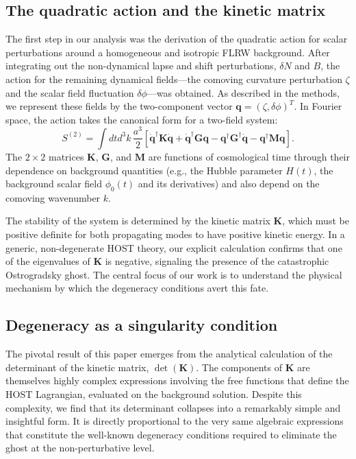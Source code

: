 \documentclass[twocolumn]{aastex631}
\begin{document}
\subsection{The quadratic action and the kinetic matrix}

The first step in our analysis was the derivation of the quadratic action for scalar perturbations around a homogeneous and isotropic FLRW background. After integrating out the non-dynamical lapse and shift perturbations, $\delta N$ and $B$, the action for the remaining dynamical fields---the comoving curvature perturbation $\zeta$ and the scalar field fluctuation $\delta\phi$---was obtained. As described in the methods, we represent these fields by the two-component vector $\mathbf{q} = (\zeta, \delta\phi)^T$. In Fourier space, the action takes the canonical form for a two-field system:
\begin{equation}
S^{(2)} = \int dt d^3k \, \frac{a^3}{2} \left[ \dot{\mathbf{q}}^\dagger \mathbf{K} \dot{\mathbf{q}} + \dot{\mathbf{q}}^\dagger \mathbf{G} \mathbf{q} - \mathbf{q}^\dagger \mathbf{G}^\dagger \dot{\mathbf{q}} - \mathbf{q}^\dagger \mathbf{M} \mathbf{q} \right].
\label{eq:S2_results}
\end{equation}
The $2 \times 2$ matrices $\mathbf{K}$, $\mathbf{G}$, and $\mathbf{M}$ are functions of cosmological time through their dependence on background quantities (e.g., the Hubble parameter $H(t)$, the background scalar field $\phi_0(t)$ and its derivatives) and also depend on the comoving wavenumber $k$.

The stability of the system is determined by the kinetic matrix $\mathbf{K}$, which must be positive definite for both propagating modes to have positive kinetic energy. In a generic, non-degenerate HOST theory, our explicit calculation confirms that one of the eigenvalues of $\mathbf{K}$ is negative, signaling the presence of the catastrophic Ostrogradsky ghost. The central focus of our work is to understand the physical mechanism by which the degeneracy conditions avert this fate.

\subsection{Degeneracy as a singularity condition}

The pivotal result of this paper emerges from the analytical calculation of the determinant of the kinetic matrix, $\det(\mathbf{K})$. The components of $\mathbf{K}$ are themselves highly complex expressions involving the free functions that define the HOST Lagrangian, evaluated on the background solution. Despite this complexity, we find that its determinant collapses into a remarkably simple and insightful form. It is directly proportional to the very same algebraic expressions that constitute the well-known degeneracy conditions required to eliminate the ghost at the non-perturbative level.
\end{document}
